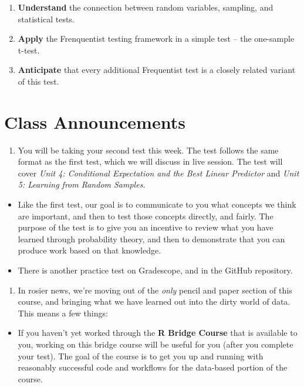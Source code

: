 \documentclass[
]{book}
\providecommand{\tightlist}{%
  \setlength{\itemsep}{0pt}\setlength{\parskip}{0pt}}
\theoremstyle{definition}
\theoremstyle{definition}
\theoremstyle{definition}
\theoremstyle{definition}
\theoremstyle{remark}
\begin{document}
\begin{enumerate}
\def\labelenumi{\arabic{enumi}.}
\tightlist
\item
  \textbf{Understand} the connection between random variables, sampling, and statistical tests.
\item
  \textbf{Apply} the Frenquentist testing framework in a simple test -- the one-sample t-test.
\item
  \textbf{Anticipate} that every additional Frequentist test is a closely related variant of this test.
\end{enumerate}

\hypertarget{class-announcements-4}{%
\section{Class Announcements}\label{class-announcements-4}}

\begin{enumerate}
\def\labelenumi{\arabic{enumi}.}
\tightlist
\item
  You will be taking your second test this week. The test follows the same format as the first test, which we will discuss in live session. The test will cover \emph{Unit 4: Conditional Expectation and the Best Linear Predictor} and \emph{Unit 5: Learning from Random Samples.}
\end{enumerate}

\begin{itemize}
\tightlist
\item
  Like the first test, our goal is to communicate to you what concepts we think are important, and then to test those concepts directly, and fairly. The purpose of the test is to give you an incentive to review what you have learned through probability theory, and then to demonstrate that you can produce work based on that knowledge.
\item
  There is another practice test on Gradescope, and in the GitHub repository.
\end{itemize}

\begin{enumerate}
\def\labelenumi{\arabic{enumi}.}
\setcounter{enumi}{1}
\tightlist
\item
  In rosier news, we're moving out of the \emph{only} pencil and paper section of this course, and bringing what we have learned out into the dirty world of data. This means a few things:
\end{enumerate}

\begin{itemize}
\tightlist
\item
  If you haven't yet worked through the \textbf{R Bridge Course} that is available to you, working on this bridge course will be useful for you (after you complete your test). The goal of the course is to get you up and running with reasonably successful code and workflows for the data-based portion of the course.
\end{itemize}
\end{document}
